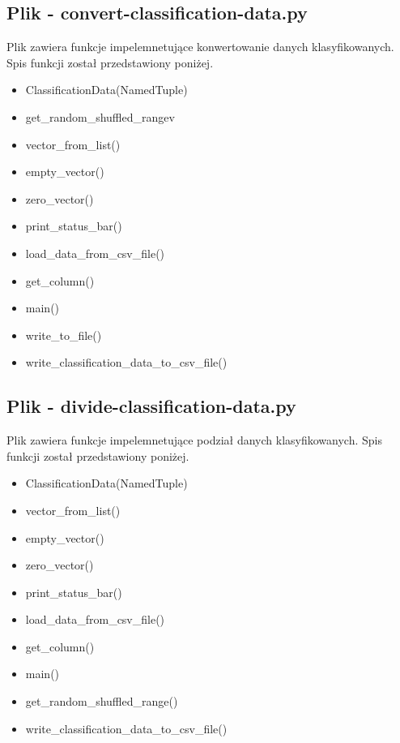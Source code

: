 \documentclass{classrep}
\begin{document}
{        \subsection{Plik - convert-classification-data.py}
        {
            Plik zawiera funkcje impelemnetujące konwertowanie danych klasyfikowanych.
            Spis funkcji został przedstawiony poniżej.
            \begin{itemize}
                \item ClassificationData(NamedTuple)
                \item get\_random\_shuffled\_rangev
                \item vector\_from\_list()
                \item empty\_vector()
                \item zero\_vector()
                \item print\_status\_bar()
                \item load\_data\_from\_csv\_file()
                \item get\_column()
                \item main()
                \item write\_to\_file()
                \item write\_classification\_data\_to\_csv\_file()
            \end{itemize}
        }

        \subsection{Plik - divide-classification-data.py}
        {
            Plik zawiera funkcje impelemnetujące podział danych klasyfikowanych.
            Spis funkcji został przedstawiony poniżej.
            \begin{itemize}
                \item ClassificationData(NamedTuple)
                \item vector\_from\_list()
                \item empty\_vector()
                \item zero\_vector()
                \item print\_status\_bar()
                \item load\_data\_from\_csv\_file()
                \item get\_column()
                \item main()
                \item get\_random\_shuffled\_range()
                \item write\_classification\_data\_to\_csv\_file()
            \end{itemize}
        }

}
\end{document}

